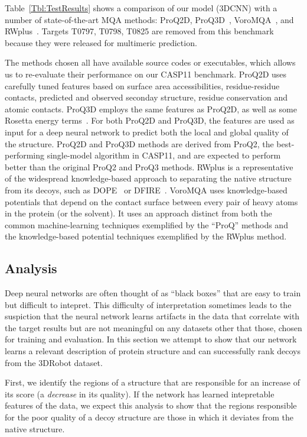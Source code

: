 \documentclass{bioinfo}
\begin{document}
Table~\ref{Tbl:TestResults} shows a comparison of our model (3DCNN)
with a number of state-of-the-art MQA methods: ProQ2D,
ProQ3D~\citep{uziela2017proq3d},
VoroMQA~\citep{olechnovivc2017voromqa}, and
RWplus~\citep{zhang2010novel}. Targets T0797, T0798, T0825 are removed
from this benchmark because they were released for multimeric
prediction.

The methods chosen all have available source codes or executables,
which allows us to re-evaluate their performance on our CASP11
benchmark.
%
ProQ2D uses carefully tuned features based on surface area
accessibilities, residue-residue contacts, predicted and observed
seconday structure, residue conservation and atomic contacts. ProQ3D
employs the same features as ProQ2D, as well as some Rosetta energy
terms~\citep{leaverfay2011rosetta}. For both ProQ2D and ProQ3D, the
features are used as input for a deep neural network to predict both
the local and global quality of the structure.
ProQ2D and ProQ3D methods are derived from ProQ2, the best-performing
single-model algorithm in CASP11, and are expected to perform better
than the original ProQ2 and ProQ3 methods.
%
RWplus is a representative of the widespread knowledge-based approach
to separating the native structure from its decoys, such as
DOPE~\citep{shen2006statistical}  or DFIRE~\citep{zhou2002distance}.
%
VoroMQA uses knowledge-based potentials that depend on the contact
surface between every pair of heavy atoms in the protein (or the
solvent). It uses an approach distinct from both the common
machine-learning techniques exemplified by the ``ProQ'' methods and
the knowledge-based potential techniques exemplified by the RWplus
method.
%
%
\subsection{Analysis}
%
Deep neural networks are often thought of as ``black boxes'' that are
easy to train but difficult to intepret. This difficulty of
interpretation sometimes leads to the suspiction that the neural
network learns artifacts in the data that correlate with the target
results but are not meaningful on any datasets other that those,
chosen for training and evaluation.
%
In this section we attempt to show that our network learns a relevant
description of protein structure and can successfully rank decoys from
the 3DRobot dataset.

First, we identify the regions of a structure that are responsible for
an increase of its score (a \emph{decrease} in its quality). If the
network has learned intepretable features of the data, we expect this
analysis to show that the regions responsible for the poor quality of
a decoy structure are those in which it deviates from the native
structure.
\end{document}
